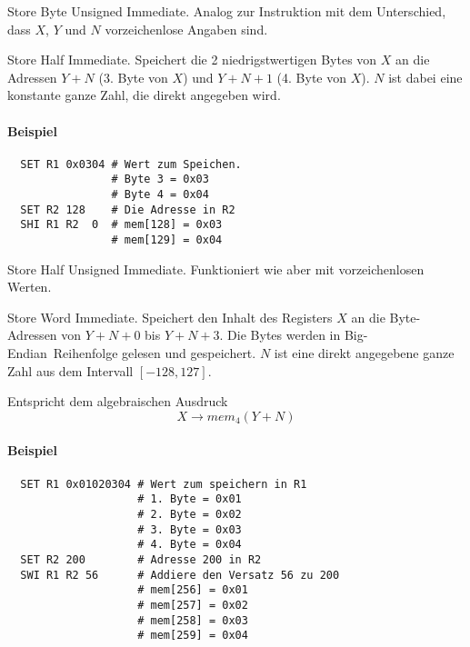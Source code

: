 \glqq Store Byte Unsigned Immediate\grqq.
Analog zur Instruktion  mit dem Unterschied, dass $X$, $Y$ und $N$
vorzeichenlose Angaben sind.



\glqq Store Half Immediate\grqq.
Speichert die 2 niedrigstwertigen Bytes von $X$ an die Adressen 
$Y + N$ (3. Byte von $X$) und $Y + N + 1$ (4. Byte von $X$).
$N$ ist dabei eine konstante ganze Zahl, die direkt angegeben wird. 

\paragraph{Beispiel}
\begin{lstlisting}
  SET R1 0x0304 # Wert zum Speichen.
                # Byte 3 = 0x03
                # Byte 4 = 0x04
  SET R2 128    # Die Adresse in R2
  SHI R1 R2  0  # mem[128] = 0x03
                # mem[129] = 0x04
\end{lstlisting}



\glqq Store Half Unsigned Immediate\grqq.
Funktioniert wie  aber mit vorzeichenlosen Werten.



\glqq Store Word Immediate\grqq.
Speichert den Inhalt des Registers $X$ an die Byte-Adressen von $Y+N+0$ bis 
$Y + N + 3$. Die Bytes werden in \glqq Big-Endian\grqq\ Reihenfolge gelesen und
gespeichert. $N$ ist eine direkt angegebene ganze Zahl aus dem Intervall 
$[-128, 127]$.

Entspricht dem algebraischen Ausdruck
\[
    X \to mem_{4}(Y + N)
\]

\paragraph{Beispiel}
\begin{lstlisting}
  SET R1 0x01020304 # Wert zum speichern in R1
                    # 1. Byte = 0x01
                    # 2. Byte = 0x02
                    # 3. Byte = 0x03
                    # 4. Byte = 0x04
  SET R2 200        # Adresse 200 in R2
  SWI R1 R2 56      # Addiere den Versatz 56 zu 200
                    # mem[256] = 0x01
                    # mem[257] = 0x02
                    # mem[258] = 0x03
                    # mem[259] = 0x04
\end{lstlisting}



